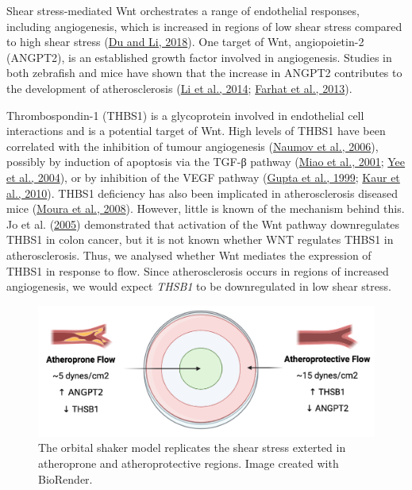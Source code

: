 \documentclass[
  11pt,
]{article}
\begin{document}
Shear stress-mediated Wnt orchestrates a range of endothelial responses, including angiogenesis, which is increased in regions of low shear stress compared to high shear stress (\protect\hyperlink{ref-du2018}{Du and Li, 2018}). One target of Wnt, angiopoietin-2 (ANGPT2), is an established growth factor involved in angiogenesis. Studies in both zebrafish and mice have shown that the increase in ANGPT2 contributes to the development of atherosclerosis (\protect\hyperlink{ref-Li2014-mx}{Li et al., 2014}; \protect\hyperlink{ref-farhat2013}{Farhat et al., 2013}).

Thrombospondin-1 (THBS1) is a glycoprotein involved in endothelial cell interactions and is a potential target of Wnt.
High levels of THBS1 have been correlated with the inhibition of tumour angiogenesis (\protect\hyperlink{ref-naumov2006}{Naumov et al., 2006}), possibly by induction of apoptosis via the TGF-β pathway (\protect\hyperlink{ref-Miao2001}{Miao et al., 2001}; \protect\hyperlink{ref-yee2004}{Yee et al., 2004}), or by inhibition of the VEGF pathway (\protect\hyperlink{ref-gupta1999}{Gupta et al., 1999}; \protect\hyperlink{ref-kaur2010}{Kaur et al., 2010}).
THBS1 deficiency has also been implicated in atherosclerosis diseased mice (\protect\hyperlink{ref-Moura2008}{Moura et al., 2008}).
However, little is known of the mechanism behind this.
Jo et al. (\protect\hyperlink{ref-jo2005}{2005}) demonstrated that activation of the Wnt pathway downregulates THBS1 in colon cancer, but it is not known whether WNT regulates THBS1 in atherosclerosis.
Thus, we analysed whether Wnt mediates the expression of THBS1 in response to flow.
Since atherosclerosis occurs in regions of increased angiogenesis, we would expect \emph{THSB1} to be downregulated in low shear stress.

\begin{figure}

{\centering \includegraphics[width=0.8\linewidth]{../images/orbital} 

}

\caption{The orbital shaker model replicates the shear stress exterted in atheroprone and atheroprotective regions. Image created with BioRender.}\label{fig:orbital}
\end{figure}
\end{document}
